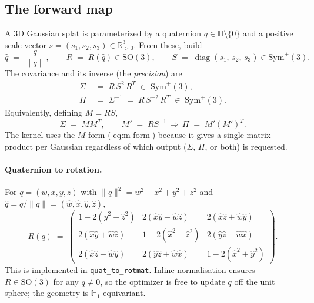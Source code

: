 \documentclass[11pt]{article}
\newcommand{\SO}{\mathrm{SO}}
\newcommand{\SymPos}{\mathrm{Sym}^{+}}
\newcommand{\diag}{\operatorname{diag}}
\newcommand{\R}{\mathbb{R}}
\newcommand{\HQ}{\mathbb{H}}
\begin{document}
\subsection{The forward map}

A 3D Gaussian splat is parameterized by a quaternion
$q \in \HQ \setminus \{0\}$ and a positive scale vector
$s = (s_{1}, s_{2}, s_{3}) \in \R^{3}_{>0}$. From these, build
\begin{equation}
  \hat q \;=\; \frac{q}{\lVert q \rVert}, \qquad
  R \;=\; R(\hat q) \in \SO(3), \qquad
  S \;=\; \diag(s_{1},\,s_{2},\,s_{3}) \in \SymPos(3).
\end{equation}
The covariance and its inverse (the \emph{precision}) are
\begin{align}
  \Sigma &\;=\; R\, S^{2}\, R^{T} \;\in\; \SymPos(3),
  \label{eq:cov}\\
  \Pi &\;=\; \Sigma^{-1} \;=\; R\, S^{-2}\, R^{T} \;\in\; \SymPos(3).
  \label{eq:prec}
\end{align}
Equivalently, defining $M = R S$,
\begin{equation}
  \Sigma \;=\; M M^{T}, \qquad
  M' \;=\; R S^{-1} \,\Longrightarrow\, \Pi \;=\; M' (M')^{T}.
  \label{eq:m-form}
\end{equation}
The kernel uses the $M$-form (\eqref{eq:m-form}) because it gives a
single matrix product per Gaussian regardless of which output
($\Sigma$, $\Pi$, or both) is requested.

\paragraph{Quaternion to rotation.}
For $q = (w, x, y, z)$ with $\lVert q \rVert^{2} = w^{2} + x^{2} + y^{2} + z^{2}$
and $\hat q = q / \lVert q \rVert = (\hat w, \hat x, \hat y, \hat z)$,
\begin{equation}
  R(q) \;=\;
  \begin{pmatrix}
    1 - 2(\hat y^{2} + \hat z^{2}) &
      2(\hat x \hat y - \hat w \hat z) &
      2(\hat x \hat z + \hat w \hat y) \\[2pt]
    2(\hat x \hat y + \hat w \hat z) &
      1 - 2(\hat x^{2} + \hat z^{2}) &
      2(\hat y \hat z - \hat w \hat x) \\[2pt]
    2(\hat x \hat z - \hat w \hat y) &
      2(\hat y \hat z + \hat w \hat x) &
      1 - 2(\hat x^{2} + \hat y^{2})
  \end{pmatrix}.
  \label{eq:quat-to-rotmat}
\end{equation}
This is implemented in \texttt{quat\_to\_rotmat}. Inline
normalisation ensures $R \in \SO(3)$ for any $q \neq 0$, so the
optimizer is free to update $q$ off the unit sphere; the geometry is
$\mathbb{H}_{1}$-equivariant.
\end{document}
